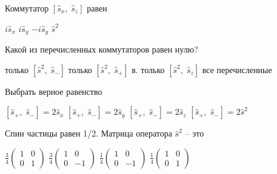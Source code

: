 \documentclass[11pt,a4paper]{exam}
\begin{document}
\begin{questions}
\question Коммутатор $\left[ {{{\hat s}_x},\;{{\hat s}_z}} \right]$ равен
\begin{choices}
\choice $i{\hat s_x}$     
\choice $i{\hat s_y}$     
\choice $ - i{\hat s_y}$  
\choice ${\hat s^2}$
\end{choices}

\question Какой из перечисленных коммутаторов равен нулю?
\begin{choices}
\choice только $\left[ {{{\hat s}^2},\;{{\hat s}_ - }} \right]$        
\choice только $\left[ {{{\hat s}^2},\;{{\hat s}_ + }} \right]$
в. только $\left[ {{{\hat s}^2},\;{{\hat s}_z}} \right]$       
\choice все перечисленные
\end{choices}

\question Выбрать верное равенство
\begin{choices}
\choice $\left[ {{{\hat s}_ + },\;{{\hat s}_ - }} \right] = 2{\hat s_x}$  
\choice $\left[ {{{\hat s}_ + },\;{{\hat s}_ - }} \right] = 2{\hat s_y}$  
\choice $\left[ {{{\hat s}_ + },\;{{\hat s}_ - }} \right] = 2{\hat s_z}$  
\choice $\left[ {{{\hat s}_ + },\;{{\hat s}_ - }} \right] = 2{\hat s^2}$
\end{choices}

\question Спин частицы равен 1/2. Матрица оператора ${\hat s^2}$ – это
\begin{choices}
\choice $\frac{3}{4}\left( {\begin{array}{*{20}{c}}
1&0\\
0&1
\end{array}} \right)$      
\choice $\frac{3}{4}\left( {\begin{array}{*{20}{c}}
1&0\\
0&{ - 1}
\end{array}} \right)$      
\choice $\frac{1}{4}\left( {\begin{array}{*{20}{c}}
1&0\\
0&{ - 1}
\end{array}} \right)$      
\choice $\frac{1}{4}\left( {\begin{array}{*{20}{c}}
1&0\\
0&1
\end{array}} \right)$
\end{choices}


\end{questions}
\end{document}
